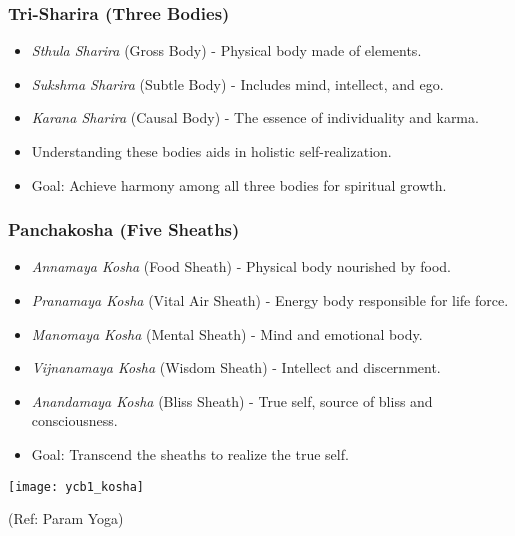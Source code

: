 \begin{frame}[fragile]\frametitle{Tri-Sharira (Three Bodies)}

      \begin{itemize}
		\item \textit{Sthula Sharira} (Gross Body) - Physical body made of elements.
		\item \textit{Sukshma Sharira} (Subtle Body) - Includes mind, intellect, and ego.
		\item \textit{Karana Sharira} (Causal Body) - The essence of individuality and karma.
		\item Understanding these bodies aids in holistic self-realization.
		\item Goal: Achieve harmony among all three bodies for spiritual growth.
	  \end{itemize}

\end{frame}

\begin{frame}[fragile]\frametitle{Panchakosha (Five Sheaths)}

      \begin{itemize}
		\item \textit{Annamaya Kosha} (Food Sheath) - Physical body nourished by food.
		\item \textit{Pranamaya Kosha} (Vital Air Sheath) - Energy body responsible for life force.
		\item \textit{Manomaya Kosha} (Mental Sheath) - Mind and emotional body.
		\item \textit{Vijnanamaya Kosha} (Wisdom Sheath) - Intellect and discernment.
		\item \textit{Anandamaya Kosha} (Bliss Sheath) - True self, source of bliss and consciousness.
		\item Goal: Transcend the sheaths to realize the true self.
	  \end{itemize}

      \begin{center}
        \texttt{[image: ycb1\_kosha]}

		{\tiny (Ref: Param Yoga)}		
        \end{center}
\end{frame}

